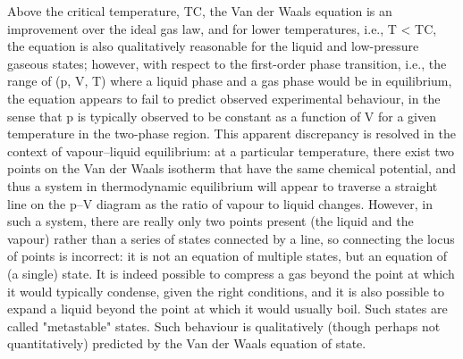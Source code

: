 Above the critical temperature, TC, the Van der Waals equation is an improvement over the ideal gas law, and for lower temperatures, i.e., T < TC, the equation is also qualitatively reasonable for the liquid and low-pressure gaseous states; however, with respect to the first-order phase transition, i.e., the range of (p, V, T) where a liquid phase and a gas phase would be in equilibrium, the equation appears to fail to predict observed experimental behaviour, in the sense that p is typically observed to be constant as a function of V for a given temperature in the two-phase region. This apparent discrepancy is resolved in the context of vapour–liquid equilibrium: at a particular temperature, there exist two points on the Van der Waals isotherm that have the same chemical potential, and thus a system in thermodynamic equilibrium will appear to traverse a straight line on the p–V diagram as the ratio of vapour to liquid changes. However, in such a system, there are really only two points present (the liquid and the vapour) rather than a series of states connected by a line, so connecting the locus of points is incorrect: it is not an equation of multiple states, but an equation of (a single) state. It is indeed possible to compress a gas beyond the point at which it would typically condense, given the right conditions, and it is also possible to expand a liquid beyond the point at which it would usually boil. Such states are called "metastable" states. Such behaviour is qualitatively (though perhaps not quantitatively) predicted by the Van der Waals equation of state.
\cite{website}
